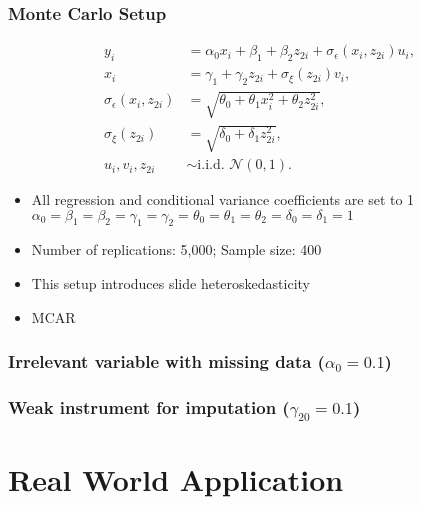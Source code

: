 \documentclass[aspectratio=1610]{beamer}
\begin{document}
\begin{frame}
	\frametitle{Monte Carlo Setup}
	\begin{equation}
		\begin{aligned}
			y_i &= \alpha_0 x_i + \beta_1 + \beta_2 z_{2i} + \sigma_{\epsilon}(x_i, z_{2i})u_i, \\
			x_i &= \gamma_1 + \gamma_2 z_{2i} + \sigma_{\xi}(z_{2i})v_i, \\
			\sigma_{\epsilon}(x_i, z_{2i}) &= \sqrt{\theta_0 + \theta_1 x_i^2 + \theta_2 z_{2i}^2}, \\
			\sigma_{\xi}(z_{2i}) &= \sqrt{\delta_0 + \delta_1 z_{2i}^2}, \\
			u_i, v_i, z_{2i} &\sim \text{i.i.d. } \mathcal{N}(0,1).
		\end{aligned}
	\end{equation}
	\begin{itemize}
		\item All regression and conditional variance coefficients are set to 1\\
		$\alpha_0 = \beta_1 = \beta_2 = \gamma_1 = \gamma_2 = \theta_0 = \theta_1 = \theta_2 = \delta_0 = \delta_1 = 1$
		\item Number of replications: 5,000; Sample size: 400
		\item This setup introduces slide heteroskedasticity
		\item MCAR
	\end{itemize}
\end{frame}


\begin{frame}
	\frametitle{Irrelevant variable with missing data ($\alpha_0 = 0.1$)}
    
\end{frame}

\begin{frame}
	\frametitle{Weak instrument for imputation ($\gamma_{20} = 0.1$)}
    
\end{frame}


\section{Real World Application}
\end{document}
